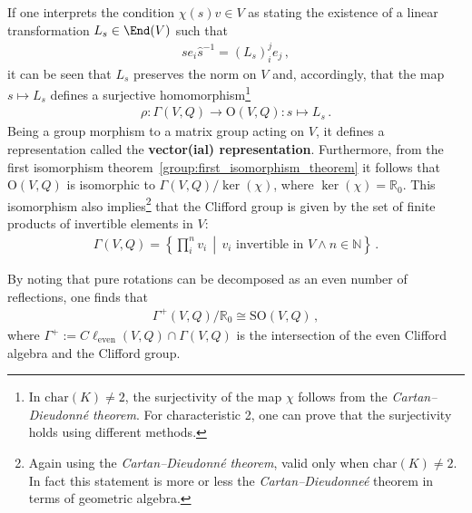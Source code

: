     \begin{property}
        If one interprets the condition $\chi(s)v\in V$ as stating the existence of a linear transformation $L_s\in\End(V)$ such that
        \begin{gather}
            se_i\widehat{s}^{-1} = (L_s)^j_ie_j\,,
        \end{gather}
        it can be seen that $L_s$ preserves the norm on $V$ and, accordingly, that the map $s\mapsto L_s$ defines a surjective homomorphism\footnote{In $\mathrm{char}(K)\neq2$, the surjectivity of the map $\chi$ follows from the \textit{Cartan--Dieudonn\'e theorem}. For characteristic 2, one can prove that the surjectivity holds using different methods.}
        \begin{gather}
            \rho:\Gamma(V,Q)\rightarrow\mathrm{O}(V,Q):s\mapsto L_s\,.
        \end{gather}
        Being a group morphism to a matrix group acting on $V$, it defines a representation called the \textbf{vector(ial) representation}. Furthermore, from the first isomorphism theorem~\ref{group:first_isomorphism_theorem} it follows that $\mathrm{O}(V,Q)$ is isomorphic to $\Gamma(V,Q)/\ker(\chi)$, where $\ker(\chi)=\mathbb{R}_0$. This isomorphism also implies\footnote{Again using the \textit{Cartan--Dieudonn\'e theorem}, valid only when $\mathrm{char}(K)\neq2$. In fact this statement is more or less the \textit{Cartan--Dieudonne\'e} theorem in terms of geometric algebra.} that the Clifford group is given by the set of finite products of invertible elements in $V$:
        \begin{gather}
            \Gamma(V,Q) = \left\{\prod_i^nv_i\,\middle\vert\,v_i\text{ invertible in }V\land n\in\mathbb{N}\right\}\,.
        \end{gather}
    \end{property}
    \begin{result}
        By noting that pure rotations can be decomposed as an even number of reflections, one finds that
        \begin{gather}
            \Gamma^+(V,Q)/\mathbb{R}_0\cong\mathrm{SO}(V,Q)\,,
        \end{gather}
        where $\Gamma^+:=C\ell_\text{even}(V,Q)\cap\Gamma(V,Q)$ is the intersection of the even Clifford algebra and the Clifford group.
    \end{result}

